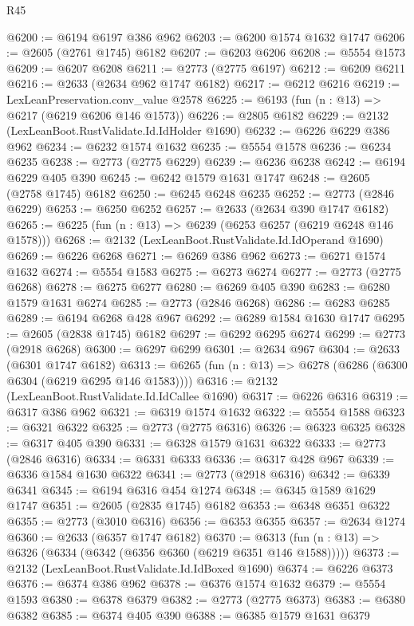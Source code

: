 \begin{lexlean}{R45}
\begin{coremodule}
@6200 := @6194 @6197 @386 @962
@6203 := @6200 @1574 @1632 @1747
@6206 := @2605 (@2761 @1745) @6182
@6207 := @6203 @6206
@6208 := @5554 @1573
@6209 := @6207 @6208
@6211 := @2773 (@2775 @6197)
@6212 := @6209 @6211
@6216 := @2633 (@2634 @962 @1747 @6182)
@6217 := @6212 @6216
@6219 := LexLeanPreservation.conv_value @2578
@6225 := @6193 (fun (n : @13) => @6217 (@6219 @6206 @146 @1573))
@6226 := @2805 @6182
@6229 := @2132 (LexLeanBoot.RustValidate.Id.IdHolder @1690)
@6232 := @6226 @6229 @386 @962
@6234 := @6232 @1574 @1632
@6235 := @5554 @1578
@6236 := @6234 @6235
@6238 := @2773 (@2775 @6229)
@6239 := @6236 @6238
@6242 := @6194 @6229 @405 @390
@6245 := @6242 @1579 @1631 @1747
@6248 := @2605 (@2758 @1745) @6182
@6250 := @6245 @6248 @6235
@6252 := @2773 (@2846 @6229)
@6253 := @6250 @6252
@6257 := @2633 (@2634 @390 @1747 @6182)
@6265 := @6225 (fun (n : @13) => @6239 (@6253 @6257 (@6219 @6248 @146 @1578)))
@6268 := @2132 (LexLeanBoot.RustValidate.Id.IdOperand @1690)
@6269 := @6226 @6268
@6271 := @6269 @386 @962
@6273 := @6271 @1574 @1632
@6274 := @5554 @1583
@6275 := @6273 @6274
@6277 := @2773 (@2775 @6268)
@6278 := @6275 @6277
@6280 := @6269 @405 @390
@6283 := @6280 @1579 @1631 @6274
@6285 := @2773 (@2846 @6268)
@6286 := @6283 @6285
@6289 := @6194 @6268 @428 @967
@6292 := @6289 @1584 @1630 @1747
@6295 := @2605 (@2838 @1745) @6182
@6297 := @6292 @6295 @6274
@6299 := @2773 (@2918 @6268)
@6300 := @6297 @6299
@6301 := @2634 @967
@6304 := @2633 (@6301 @1747 @6182)
@6313 := @6265 (fun (n : @13) => @6278 (@6286 (@6300 @6304 (@6219 @6295 @146 @1583))))
@6316 := @2132 (LexLeanBoot.RustValidate.Id.IdCallee @1690)
@6317 := @6226 @6316
@6319 := @6317 @386 @962
@6321 := @6319 @1574 @1632
@6322 := @5554 @1588
@6323 := @6321 @6322
@6325 := @2773 (@2775 @6316)
@6326 := @6323 @6325
@6328 := @6317 @405 @390
@6331 := @6328 @1579 @1631 @6322
@6333 := @2773 (@2846 @6316)
@6334 := @6331 @6333
@6336 := @6317 @428 @967
@6339 := @6336 @1584 @1630 @6322
@6341 := @2773 (@2918 @6316)
@6342 := @6339 @6341
@6345 := @6194 @6316 @454 @1274
@6348 := @6345 @1589 @1629 @1747
@6351 := @2605 (@2835 @1745) @6182
@6353 := @6348 @6351 @6322
@6355 := @2773 (@3010 @6316)
@6356 := @6353 @6355
@6357 := @2634 @1274
@6360 := @2633 (@6357 @1747 @6182)
@6370 := @6313 (fun (n : @13) => @6326 (@6334 (@6342 (@6356 @6360 (@6219 @6351 @146 @1588)))))
@6373 := @2132 (LexLeanBoot.RustValidate.Id.IdBoxed @1690)
@6374 := @6226 @6373
@6376 := @6374 @386 @962
@6378 := @6376 @1574 @1632
@6379 := @5554 @1593
@6380 := @6378 @6379
@6382 := @2773 (@2775 @6373)
@6383 := @6380 @6382
@6385 := @6374 @405 @390
@6388 := @6385 @1579 @1631 @6379

\end{coremodule}
\end{lexlean}
